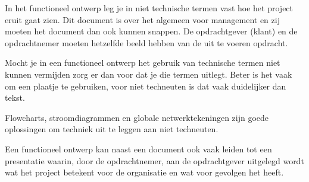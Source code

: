 
In het functioneel ontwerp leg je in niet technische termen vast hoe het project eruit gaat zien. Dit document is over het algemeen voor management en zij moeten het document dan ook kunnen snappen. De opdrachtgever (klant) en de opdrachtnemer moeten hetzelfde beeld hebben van de uit te voeren opdracht.

Mocht je in een functioneel ontwerp het gebruik van technische termen niet kunnen vermijden zorg er dan voor dat je die termen uitlegt. Beter is het vaak om een plaatje te gebruiken, voor niet techneuten is dat vaak duidelijker dan tekst.

Flowcharts, stroomdiagrammen en globale netwerktekeningen zijn goede oplossingen om techniek uit te leggen aan niet techneuten.

Een functioneel ontwerp kan naast een document ook vaak leiden tot een presentatie waarin, door de opdrachtnemer, aan de opdrachtgever uitgelegd wordt wat het project betekent voor de organisatie en wat voor gevolgen het heeft.
